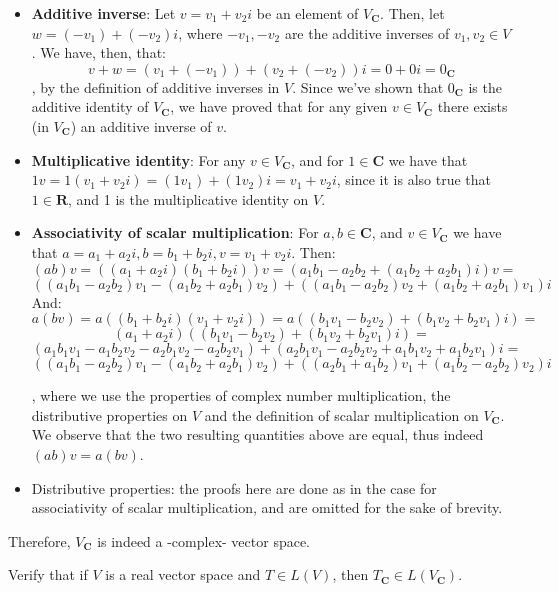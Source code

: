 \begin{solution}
\begin{itemize}
        \item \textbf{Additive inverse}: Let $v = v_1+v_2i$ be an element of $V_\mathbf{C}$. Then, let $w = (-v_1)+(-v_2)i$, where $-v_1, -v_2$ are the additive inverses of $v_1, v_2 \in V$. We have, then, that:
        $$v + w = (v_1+(-v_1))+(v_2+(-v_2))i = 0 +0i = 0_\mathbf{C}$$
        , by the definition of additive inverses in $V$. Since we've shown that $0_\mathbf{C}$ is the additive identity of $V_\mathbf{C}$, we have proved that for any given $v \in V_\mathbf{C}$ there exists (in $V_\mathbf{C}$) an additive inverse of $v$.
        \item \textbf{Multiplicative identity}: For any $v \in V_\mathbf{C}$, and for $1 \in \mathbf{C}$ we have that $1v = 1(v_1+v_2i) = (1v_1) + (1v_2)i = v_1+v_2i$, since it is also true that $1 \in \mathbf{R}$, and 1 is the multiplicative identity on $V$.
        \item \textbf{Associativity of scalar multiplication}: For $a, b \in \mathbf{C}$, and $v \in V_\mathbf{C}$ we have that $a = a_1+a_2i, b=b_1+b_2i, v=v_1+v_2i$. Then:
        $$(ab)v = ((a_1+a_2i)(b_1+b_2i))v = (a_1b_1 - a_2b_2 + (a_1b_2 +a_2b_1)i)v = $$
        $$((a_1b_1 - a_2b_2)v_1 - (a_1b_2 + a_2b_1)v_2)+( (a_1b_1-a_2b_2)v_2 +(a_1b_2+a_2b_1)v_1)i$$
        And:
        $$a(bv) = a((b_1+b_2i)(v_1+v_2i))=a( (b_1v_1 -b_2v_2)+(b_1v_2+b_2v_1)i) = $$
        $$(a_1+a_2i)( (b_1v_1 - b_2v_2) + (b_1v_2 + b_2v_1)i) =$$ 
        $$(a_1b_1v_1 - a_1b_2v_2 - a_2b_1v_2 -a_2b_2v_1) + (a_2b_1v_1-a_2b_2v_2+a_1b_1v_2+a_1b_2v_1)i =$$
        $$((a_1b_1-a_2b_2)v_1 - (a_1b_2+a_2b_1)v_2)+((a_2b_1+a_1b_2)v_1+(a_1b_2-a_2b_2)v_2)i$$

        , where we use the properties of complex number multiplication, the distributive properties on $V$ and the definition of scalar multiplication on $V_\mathbf{C}$. We observe that the two resulting quantities above are equal, thus indeed $(ab)v = a(bv)$.
        \item {Distributive properties}: the proofs here are done as in the case for associativity of scalar multiplication, and are omitted for the sake of brevity.
    \end{itemize}

    Therefore, $V_\mathbf{C}$ is indeed a -complex- vector space.
\end{solution}

\begin{exercise}{2}
    Verify that if $V$ is a real vector space and $T \in L(V)$, then $T_\mathbf{C} \in L(V_\mathbf{C})$.
\end{exercise}

